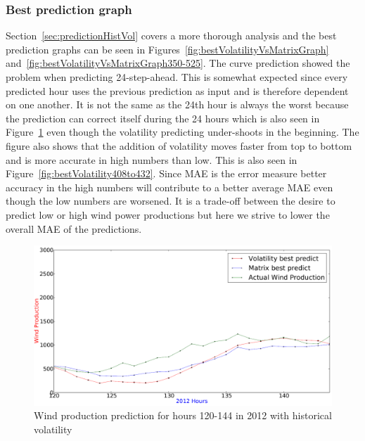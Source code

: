 \subsubsection{Best prediction graph}
Section~\ref{sec:predictionHistVol} covers a more thorough analysis and the best prediction graphs can be seen in Figures~\ref{fig:bestVolatilityVsMatrixGraph} and~\ref{fig:bestVolatilityVsMatrixGraph350-525}. The curve prediction showed the problem when predicting 24-step-ahead. This is somewhat expected since every predicted hour uses the previous prediction as input and is therefore dependent on one another. It is not the same as the 24th hour is always the worst because the prediction can correct itself during the 24 hours which is also seen in Figure~\ref{fig:bestVolatility120to144} even though the volatility predicting under-shoots in the beginning. The figure also shows that the addition of volatility moves faster from top to bottom and is more accurate in high numbers than low. This is also seen in Figure~\ref{fig:bestVolatility408to432}. Since MAE is the error measure better accuracy in the high numbers will contribute to a better average MAE even though the low numbers are worsened. It is a trade-off between the desire to predict low or high wind power productions but here we strive to lower the overall MAE of the predictions.

\begin{figure}[H]
\centering
\includegraphics[width=0.99\linewidth]{billeder/bestVolatility120to144.png}
\caption{Wind production prediction for hours 120-144 in 2012 with historical volatility}
\label{fig:bestVolatility120to144}
\end{figure} 

